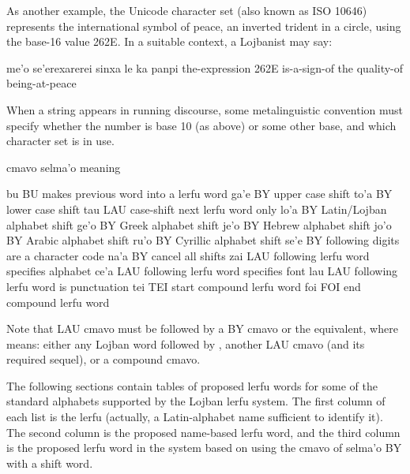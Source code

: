 As another example, the Unicode character set (also known as
    ISO 10646) represents the international symbol of peace, an
    inverted trident in a circle, using the base-16 value 262E. In
    a suitable context, a Lojbanist may say:
\begin{example}
me'o se'erexarerei sinxa le ka panpi\n
the-expression  262E is-a-sign-of\n
\T	the quality-of being-at-peace
\end{example}

When a  string appears in running discourse, some
    metalinguistic convention must specify whether the number is
    base 10 (as above) or some other base, and which character set
    is in use.



cmavo   selma'o     meaning

bu  BU      makes previous word into
                    a lerfu word
    ga'e    BY      upper case shift
    to'a    BY      lower case shift
    tau LAU     case-shift next lerfu word only
    lo'a    BY      Latin/Lojban alphabet shift
    ge'o    BY      Greek alphabet shift
    je'o    BY      Hebrew alphabet shift
    jo'o    BY      Arabic alphabet shift
    ru'o    BY      Cyrillic alphabet shift
    se'e    BY      following digits are
                    a character code
    na'a    BY      cancel all shifts
    zai LAU     following lerfu word
                    specifies alphabet
    ce'a    LAU     following lerfu word
                    specifies font
    lau LAU     following lerfu word
                    is punctuation
    tei TEI     start compound lerfu word
    foi FOI     end compound lerfu word

Note that LAU cmavo must be followed by a BY cmavo or the
    equivalent, where  means: either any Lojban word
    followed by , another LAU cmavo (and its required
    sequel), or a  compound cmavo.



The following sections contain tables of proposed lerfu
    words for some of the standard alphabets supported by the
    Lojban lerfu system. The first column of each list is the lerfu
    (actually, a Latin-alphabet name sufficient to identify it).
    The second column is the proposed name-based lerfu word, and
    the third column is the proposed lerfu word in the system based
    on using the cmavo of selma'o BY with a shift word.

